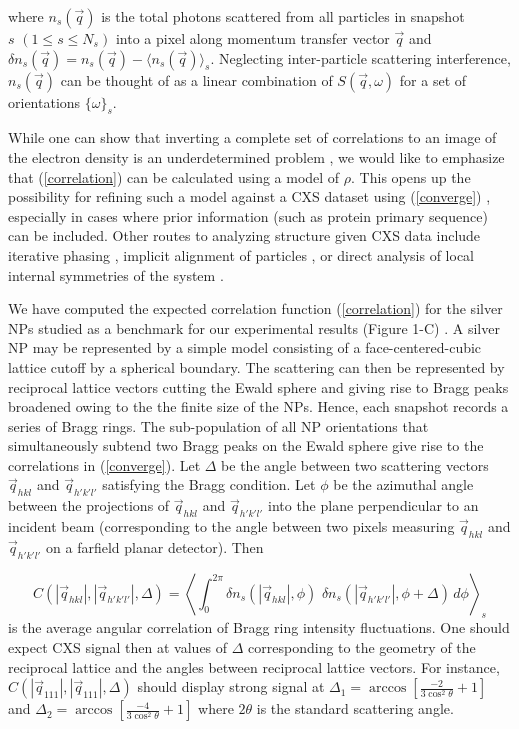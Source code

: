\documentclass [11pt,fleqn]{article}
\def \be {\begin{equation}}
\def \ee {\end{equation}}
\begin{document}
where $n_{s}(\vec{q})$ is the total photons scattered from all particles in snapshot $s \,\,(1 \leq s \leq N_{s} )$ into a pixel along momentum transfer vector $\vec{q}$ and $\delta n_{s}(\vec{q}) = n_{s}(\vec{q}) - \langle n_{s}(\vec{q}) \rangle_{s}$. Neglecting inter-particle scattering interference, $n_{s}(\vec{q})$ can be thought of as a linear combination of $S(\vec{q},\omega)$ for a set of orientations $\{ \omega\}_{s}$. 

While one can show that inverting a complete set of correlations to an image of the electron density is an underdetermined problem \cite{Elser:2011ez}, we would like to emphasize that (\ref{correlation}) can be calculated using a model of $\rho$. This opens up the possibility for refining such a model against a CXS dataset using (\ref{converge}) \cite{Liu:2013dv, Chen:2013io, Saldin:2009jj}, especially in cases where prior information (such as protein primary sequence) can be included. Other routes to analyzing structure given CXS data include iterative phasing \cite{Saldin:2010bx}, implicit alignment of particles \cite{Poon:2013ia}, or direct analysis of local internal symmetries of the system \cite{Kurta:2012cb, Kurta:2013to}.

We have computed the expected correlation function (\ref{correlation}) for the silver NPs studied as a benchmark for our experimental results (Figure 1-C) . A silver NP may be represented by a simple model consisting of a face-centered-cubic lattice cutoff by a spherical boundary. The scattering can then be represented by reciprocal lattice vectors cutting the Ewald sphere and giving rise to Bragg peaks broadened owing to the the finite size of the NPs.  Hence, each snapshot records a series of  Bragg rings. The sub-population of all NP orientations that simultaneously subtend two Bragg peaks on the Ewald sphere give rise to the correlations in (\ref{converge}). Let $\Delta$ be the angle between two scattering vectors $\vec{q}_{hkl}$ and $\vec{q}_{h'k'l'}$ satisfying the Bragg condition. Let $\phi$ be the azimuthal angle between the projections of $\vec{q}_{hkl}$ and $\vec{q}_{h'k'l'}$ into the plane perpendicular to an incident beam (corresponding to the angle between two pixels measuring $\vec{q}_{hkl}$ and $\vec{q}_{h'k'l'}$ on a farfield planar detector). Then

\be \label{angular}
C (|\vec{q}_{hkl}|,|\vec{q}_{h'k'l'}|, \Delta  ) = \left \langle \int_{0}^{2\pi} \delta n_{s} (| \vec{q}_{hkl}|,\phi ) \,\, \delta n_{s} (|\vec{q}_{h'k'l'}|,\phi + \Delta )\, d\phi  \right \rangle_{s}
\ee
is the average angular correlation of Bragg ring intensity fluctuations. One should expect CXS signal then at values of $\Delta $ corresponding to the geometry of the reciprocal lattice and the angles between reciprocal lattice vectors. For instance, $C (|\vec{q}_{111}|,|\vec{q}_{111}|, \Delta  )$ should display strong signal at $\Delta_1 = \arccos[ \frac{-2}{3\cos^{2}\theta} + 1  ]$ and $\Delta_2 = \arccos[ \frac{-4}{3\cos^{2}\theta} + 1  ]$ where $2\theta$ is the standard scattering angle.
\end{document}
